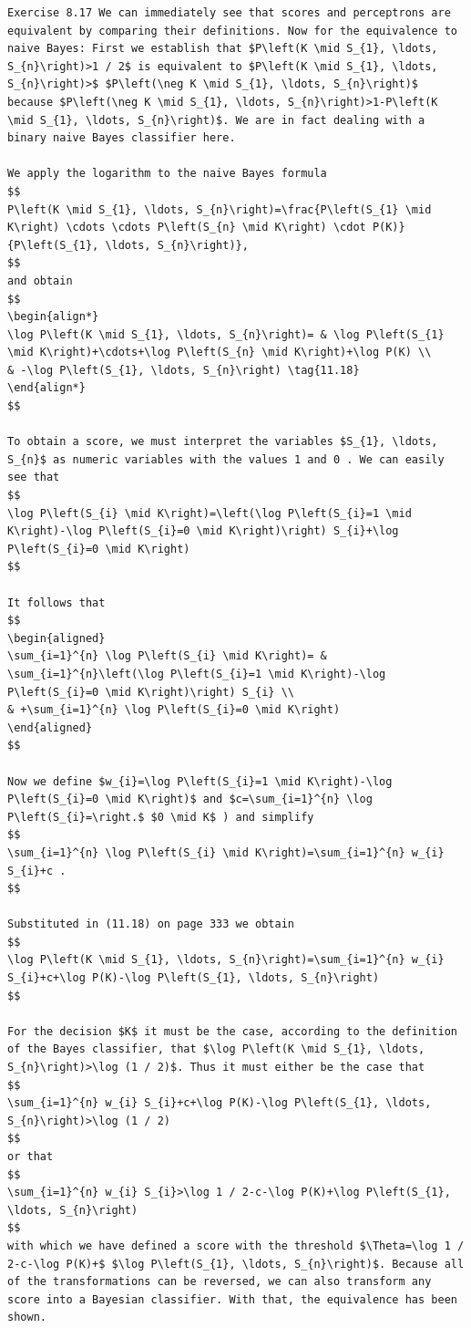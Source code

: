 \documentclass[10pt]{book}
\begin{document}
\begin{center}
\begin{enumerate}
\begin{center}
\begin{center}
\begin{center}
\begin{center}
\begin{center}
\begin{verbatim}
Exercise 8.17 We can immediately see that scores and perceptrons are equivalent by comparing their definitions. Now for the equivalence to naive Bayes: First we establish that $P\left(K \mid S_{1}, \ldots, S_{n}\right)>1 / 2$ is equivalent to $P\left(K \mid S_{1}, \ldots, S_{n}\right)>$ $P\left(\neg K \mid S_{1}, \ldots, S_{n}\right)$ because $P\left(\neg K \mid S_{1}, \ldots, S_{n}\right)>1-P\left(K \mid S_{1}, \ldots, S_{n}\right)$. We are in fact dealing with a binary naive Bayes classifier here.

We apply the logarithm to the naive Bayes formula
$$
P\left(K \mid S_{1}, \ldots, S_{n}\right)=\frac{P\left(S_{1} \mid K\right) \cdots \cdots P\left(S_{n} \mid K\right) \cdot P(K)}{P\left(S_{1}, \ldots, S_{n}\right)},
$$
and obtain
$$
\begin{align*}
\log P\left(K \mid S_{1}, \ldots, S_{n}\right)= & \log P\left(S_{1} \mid K\right)+\cdots+\log P\left(S_{n} \mid K\right)+\log P(K) \\
& -\log P\left(S_{1}, \ldots, S_{n}\right) \tag{11.18}
\end{align*}
$$

To obtain a score, we must interpret the variables $S_{1}, \ldots, S_{n}$ as numeric variables with the values 1 and 0 . We can easily see that
$$
\log P\left(S_{i} \mid K\right)=\left(\log P\left(S_{i}=1 \mid K\right)-\log P\left(S_{i}=0 \mid K\right)\right) S_{i}+\log P\left(S_{i}=0 \mid K\right)
$$

It follows that
$$
\begin{aligned}
\sum_{i=1}^{n} \log P\left(S_{i} \mid K\right)= & \sum_{i=1}^{n}\left(\log P\left(S_{i}=1 \mid K\right)-\log P\left(S_{i}=0 \mid K\right)\right) S_{i} \\
& +\sum_{i=1}^{n} \log P\left(S_{i}=0 \mid K\right)
\end{aligned}
$$

Now we define $w_{i}=\log P\left(S_{i}=1 \mid K\right)-\log P\left(S_{i}=0 \mid K\right)$ and $c=\sum_{i=1}^{n} \log P\left(S_{i}=\right.$ $0 \mid K$ ) and simplify
$$
\sum_{i=1}^{n} \log P\left(S_{i} \mid K\right)=\sum_{i=1}^{n} w_{i} S_{i}+c .
$$

Substituted in (11.18) on page 333 we obtain
$$
\log P\left(K \mid S_{1}, \ldots, S_{n}\right)=\sum_{i=1}^{n} w_{i} S_{i}+c+\log P(K)-\log P\left(S_{1}, \ldots, S_{n}\right)
$$

For the decision $K$ it must be the case, according to the definition of the Bayes classifier, that $\log P\left(K \mid S_{1}, \ldots, S_{n}\right)>\log (1 / 2)$. Thus it must either be the case that
$$
\sum_{i=1}^{n} w_{i} S_{i}+c+\log P(K)-\log P\left(S_{1}, \ldots, S_{n}\right)>\log (1 / 2)
$$
or that
$$
\sum_{i=1}^{n} w_{i} S_{i}>\log 1 / 2-c-\log P(K)+\log P\left(S_{1}, \ldots, S_{n}\right)
$$
with which we have defined a score with the threshold $\Theta=\log 1 / 2-c-\log P(K)+$ $\log P\left(S_{1}, \ldots, S_{n}\right)$. Because all of the transformations can be reversed, we can also transform any score into a Bayesian classifier. With that, the equivalence has been shown.


\end{verbatim}
\end{center}
\end{center}
\end{center}
\end{center}
\end{center}
\end{enumerate}
\end{center}
\end{document}
